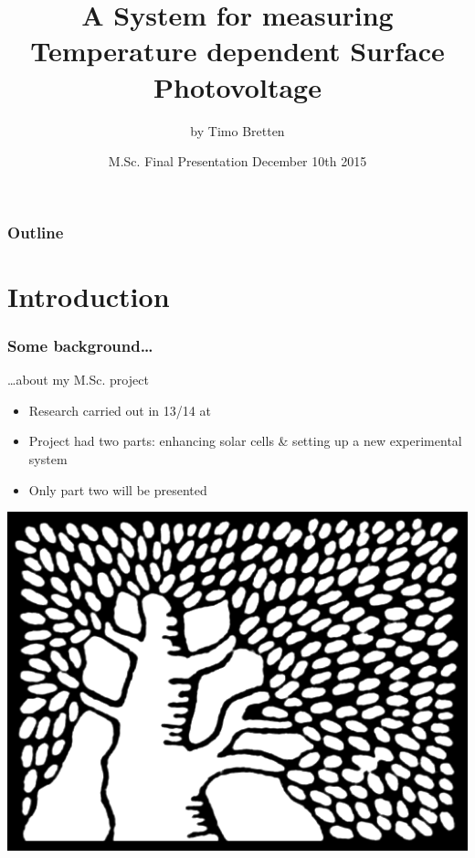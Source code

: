 \documentclass{beamer}
\title[\authorname{} M.Sc. Presentation]{A System for measuring Temperature dependent Surface Photovoltage}
\subtitle{by Timo Bretten}
\institute[\univname]{\univname}
\date[December 10th 2015]{M.Sc. Final Presentation December 10th 2015}
\begin{document}
\begin{frame}
  \titlepage
\end{frame}

\begin{frame}
  \frametitle{Outline}
  \tableofcontents
\end{frame}

\section{Introduction}

\begin{frame}
\frametitle{Some background\dots}
\begin{block}{\dots about my M.Sc. project}
\begin{minipage}{0.55\linewidth}
	\begin{itemize}
		\item Research carried out in 13/14 at \deptname{}
		\item Project had two parts: enhancing solar cells \& setting up a new experimental system
		\item Only part two will be presented
	\end{itemize}
\end{minipage}
\hfill
\begin{minipage}{0.4\linewidth}
\centering
	\includegraphics[width=1\linewidth]{./figs/logos/weiz}
\end{minipage}
\end{block}\end{frame}
\end{document}
